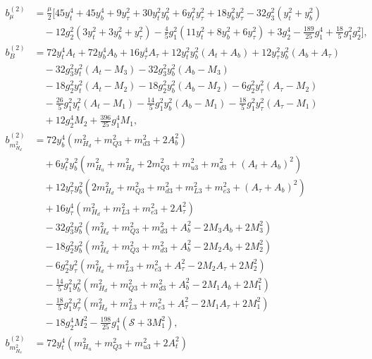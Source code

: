 \documentclass[preprint,amsmath,amssymb,aps,superscriptaddress,prd,showpacs,floatfix,nofootinbib]{revtex4-1}
\begin{document}
\begin{subequations}\label{eq:MSSMTreeLevelCoeffs}
\begin{align}
b_\mu^{(2)}&=\frac{\mu}{2}\Bigg [ 45y_t^4+45y_b^4+9y_\tau^2+30y_t^2y_b^2+6y_t^2y_\tau^2+18y_b^2y_\tau^2-32g_3^2(y_t^2+y_b^2)\nonumber\\
&\quad{}-12g_2^2(3y_t^2+3y_b^2+y_\tau^2)-\frac{4}{5}g_1^2(11y_t^2+8y_b^2+6y_\tau^2)+3g_2^4-\frac{189}{25}g_1^4+\frac{18}{5}g_1^2g_2^2\Bigg ],\label{eq:MSSMmub2}\\
b_B^{(2)}&=72y_t^4A_t+72y_b^4A_b+16y_\tau^4A_\tau+12y_t^2y_b^2(A_t+A_b)+12y_\tau^2y_b^2(A_b+A_\tau)\nonumber\\
&\quad{}-32g_3^2y_t^2(A_t-M_3)-32g_3^2y_b^2(A_b-M_3)\nonumber\\
&\quad{}-18g_2^2y_t^2(A_t-M_2)-18g_2^2y_b^2(A_b-M_2)-6g_2^2y_\tau^2(A_\tau-M_2)\nonumber\\
&\quad{}-\frac{26}{5}g_1^2y_t^2(A_t-M_1)-\frac{14}{5}g_1^2y_b^2(A_b-M_1)-\frac{18}{5}g_1^2y_\tau^2(A_\tau-M_1)\nonumber\\
&\quad{}+12g_2^4M_2+\frac{396}{25}g_1^4M_1,\label{eq:MSSMBb2}\\
b_{m_{H_d}^2}^{(2)}&=72y_b^4\left ( m_{H_d}^2+m_{Q3}^2+m_{d3}^2+2A_b^2\right )\nonumber\\
&\quad{}+6y_t^2y_b^2\left ( m_{H_u}^2+m_{H_d}^2+2m_{Q3}^2+m_{u3}^2+m_{d3}^2+(A_t+A_b)^2\right )\nonumber\\
&\quad{}+12y_\tau^2y_b^2\left ( 2m_{H_d}^2+m_{Q3}^2+m_{d3}^2+m_{L3}^2+m_{e3}^2+(A_\tau+A_b)^2\right )\nonumber\\
&\quad{}+16y_\tau^4\left ( m_{H_d}^2+m_{L3}^2+m_{e3}^2+2A_\tau^2\right )\nonumber\\
&\quad{}-32g_3^2y_b^2\left ( m_{H_d}^2+m_{Q3}^2+m_{d3}^2+A_b^2-2M_3A_b+2M_3^2\right )\nonumber\\
&\quad{}-18g_2^2y_b^2\left ( m_{H_d}^2+m_{Q3}^2+m_{d3}^2+A_b^2-2M_2A_b+2M_2^2\right )\nonumber\\
&\quad{}-6g_2^2y_\tau^2\left ( m_{H_d}^2+m_{L3}^2+m_{e3}^2+A_\tau^2-2M_2A_\tau+2M_2^2\right )\nonumber\\
&\quad{}-\frac{14}{5}g_1^2y_b^2\left ( m_{H_d}^2+m_{Q3}^2+m_{d3}^2+A_b^2-2M_1A_b+2M_1^2\right )\nonumber\\
&\quad{}-\frac{18}{5}g_1^2y_\tau^2\left ( m_{H_d}^2+m_{L3}^2+m_{e3}^2+A_\tau^2-2M_1A_\tau+2M_1^2\right )\nonumber\\
&\quad{}-18g_2^4M_2^2-\frac{198}{25}g_1^4\left ( \mathcal{S}+3M_1^2\right ),\label{eq:MSSMmHd2b2}\\
b_{m_{H_u}^2}^{(2)}&=72y_t^4\left ( m_{H_u}^2+m_{Q3}^2+m_{u3}^2+2A_t^2\right )\nonumber\\

\end{align}
\end{subequations}
\end{document}
